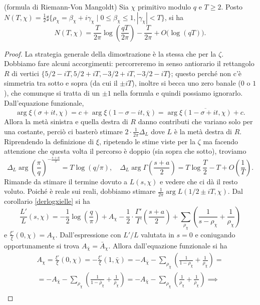 \begin{prop}
  (formula di Riemann-Von Mangoldt) Sia $\chi$ primitivo modulo $q$ e $T \ge 2$. Posto $N(T,\chi)=\frac{1}{2}\sharp\{\rho_\chi=\beta_\chi+i\gamma_\chi \mid 0 \le \beta_\chi \le 1, |\gamma_\chi|<T\}$, si ha
  $$N(T,\chi)=\frac{T}{2\pi}\log\left(\frac{qT}{2\pi}\right)-\frac{T}{2\pi}+O\big(\log(qT)\big).$$
\end{prop}

\begin{proof}
  La strategia generale della dimostrazione è la stessa che per la $\zeta$. Dobbiamo fare alcuni accorgimenti: percorreremo in senso antiorario il rettangolo $R$ di vertici $\{5/2-iT,5/2+iT, -3/2+iT, -3/2-iT\}$; questo perché non c'è simmetria tra sotto e sopra (da cui il $\pm iT$), inoltre si becca uno zero banale ($0$ o $1$), che comunque si tratta di un $\pm 1$ nella formula e quindi possiamo ignorarlo. Dall'equazione funzionale,
  $$\arg\xi(\sigma+it,\chi)=c+\arg\xi(1-\sigma-it,\bar{\chi})=\arg\overline{\xi(1-\sigma+it,\chi)}+c.$$
  Allora la metà sinistra e quella destra di $R$ danno contributi che variano solo per una costante, perciò ci basterò stimare $2\cdot\frac{1}{2\pi}\Delta_L$ dove $L$ è la metà destra di $R$. Riprendendo la definizione di $\xi$, ripetendo le stime viste per la $\zeta$ ma facendo attenzione che questa volta il percorso è doppio (sia sopra che sotto), troviamo
  $$\Delta_L \arg\left(\frac{\pi}{q}\right)^{-\frac{s+a}{2}}=T\log(q/\pi), \quad \Delta_L\arg\Gamma\left(\frac{s+a}{2}\right)=T\log\frac{T}{2}-T+O\left(\frac{1}{T}\right).$$
  Rimande da stimare il termine dovuto a $L(s,\chi)$ e vedere che ci dà il resto voluto. Poiché è reale sui reali, dobbiamo stimare $\frac{1}{2\pi}\arg L(1/2\pm iT,\chi)$. Dal corollario \ref{derlogxielle} si ha
  $$\frac{L'}{L}(s,\chi)=-\frac{1}{2}\log\left(\frac{q}{\pi}\right)+A_\chi-\frac{1}{2}\cdot\frac{\Gamma'}{\Gamma}\left(\frac{s+a}{2}\right)+\sum_{\rho_\chi} \left(\frac{1}{s-\rho_\chi}+\frac{1}{\rho_\chi}\right)$$
  e $\frac{\xi'}{\xi}(0,\chi)=A_\chi$. Dall'espressione con $L'/L$ valutata in $s=0$ e coniugando opportunamente si trova $A_{\bar{\chi}}=\bar{A}_\chi$. Allora dall'equazione funzionale si ha
  \begin{gather*}
    A_\chi=\frac{\xi'}{\xi}(0,\chi)=-\frac{\xi'}{\xi}(1,\bar{\chi})=-A_{\bar{\chi}}-\sum_{\rho_{\bar{\chi}}} \left(\frac{1}{1-\rho_{\bar{\chi}}}+\frac{1}{\rho_{\bar{\chi}}}\right)= \\
    =-A_{\bar{\chi}}-\sum_{\rho_\chi}\left(\frac{1}{1-\bar{\rho}_\chi}+\frac{1}{\bar{\rho}_\chi}\right)=-A_{\bar{\chi}}-\sum_{\rho_\chi}\left(\frac{1}{\rho_\chi}+\frac{1}{\bar{\rho}_\chi}\right) \implies \\

\end{gather*}
\end{proof}
